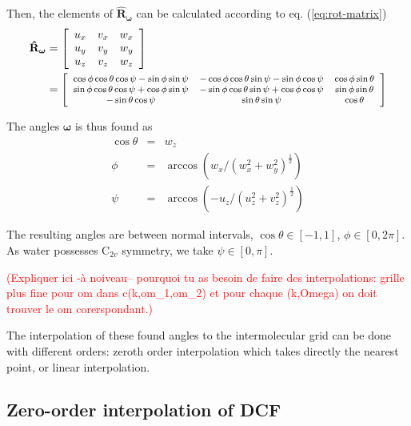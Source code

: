 Then, the elements of $\mathbf{\hat{R}}_{\boldsymbol{\omega}}$ can
be calculated according to eq. (\ref{eq:rot-matrix})
\begin{align}
\mathbf{\hat{R}}_{\boldsymbol{\omega}} & =\left[\begin{array}{ccc}
u_{x} & v_{x} & w_{x}\\
u_{y} & v_{y} & w_{y}\\
u_{z} & v_{z} & w_{z}
\end{array}\right]\\
 & =\footnotesize\left[\begin{array}{ccc}
\cos\phi\cos\theta\cos\psi-\sin\phi\sin\psi & -\cos\phi\cos\theta\sin\psi-\sin\phi\cos\psi & \cos\phi\sin\theta\\
\sin\phi\cos\theta\cos\psi+\cos\phi\sin\psi & -\sin\phi\cos\theta\sin\psi+\cos\phi\cos\psi & \sin\phi\sin\theta\\
-\sin\theta\cos\psi & \sin\theta\sin\psi & \cos\theta
\end{array}\right]\nonumber 
\end{align}


The angles $\boldsymbol{\omega}$ is thus found as
\begin{eqnarray}
\cos\theta & = & w_{z}\nonumber \\
\phi & = & \arccos(w_{x}/(w_{x}^{2}+w_{y}^{2})^{\frac{1}{2}})\label{eq:omega}\\
\psi & = & \arccos(-u_{z}/(u_{z}^{2}+v_{z}^{2})^{\frac{1}{2}})\nonumber 
\end{eqnarray}


The resulting angles are between normal intervals, $\cos\theta\in\left[-1,1\right]$,
$\phi\in\left[0,2\pi\right]$. As water possesses $\mathrm{C}_{2v}$
symmetry, we take $\psi\in\left[0,\pi\right]$. 

\textcolor{red}{(Expliquer ici -à noiveau-- pourquoi tu as besoin
de faire des interpolations: grille plus fine pour om dans c(k,om\_1,om\_2)
et pour chaque (k,Omega) on doit trouver le om corerspondant.)}

The interpolation of these found angles to the intermolecular grid
can be done with different orders: zeroth order interpolation which
takes directly the nearest point, or linear interpolation.


\subsection{Zero-order interpolation of DCF\label{sub:Zero-order-interpolation-of}}

